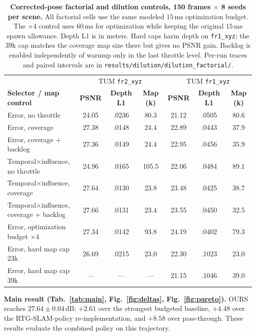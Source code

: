 \documentclass[10pt,twocolumn,letterpaper]{article}
\begin{document}
\begin{table}[t]
\centering
\footnotesize\setlength{\tabcolsep}{4pt}
\begin{tabular}{lcccccc}
\toprule
& \multicolumn{3}{c}{TUM \texttt{fr2\_xyz}} & \multicolumn{3}{c}{TUM \texttt{fr1\_xyz}} \\
\textbf{Selector / map control} & \textbf{PSNR} & \textbf{Depth L1} & \textbf{Map (k)} & \textbf{PSNR} & \textbf{Depth L1} & \textbf{Map (k)} \\
\midrule
Error, no throttle & 24.05 & .0236 & 80.3 & 21.12 & .0505 & 80.6 \\
Error, coverage & 27.38 & .0148 & 24.4 & 22.89 & .0443 & 37.9 \\
Error, coverage + backlog & 27.36 & .0149 & 24.4 & 22.95 & .0456 & 35.9 \\
Temporal$\times$influence, no throttle & 24.96 & .0165 & 105.5 & 22.06 & .0484 & 89.1 \\
Temporal$\times$influence, coverage & 27.64 & .0130 & 23.8 & 23.48 & .0425 & 38.7 \\
Temporal$\times$influence, coverage + backlog & 27.66 & .0131 & 23.4 & 23.55 & .0450 & 32.5 \\
\midrule
Error, optimization budget $\times4$ & 27.34 & .0142 & 93.8 & 24.19 & .0402 & 79.3 \\
Error, hard map cap 23k & 26.69 & .0215 & 23.0 & 22.30 & .1023 & 23.0 \\
Error, hard map cap 39k & --- & --- & --- & 21.15 & .1046 & 39.0 \\
\bottomrule
\end{tabular}
\caption{\textbf{Corrected-pose factorial and dilution controls, 150 frames $\times$ 8 seeds per scene.} All factorial cells use the same modeled $15\,\mathrm{ms}$ optimization budget. The $\times4$ control uses $60\,\mathrm{ms}$ for optimization while keeping the original $15\,\mathrm{ms}$ spawn allowance. Depth L1 is in meters. Hard caps harm depth on \texttt{fr1\_xyz}; the 39k cap matches the coverage map size there but gives no PSNR gain. Backlog is enabled independently of warmup only in the last throttle level. Per-run traces and paired intervals are in \texttt{results/dilution/dilution\_factorial/}.}
\label{tab:factorial}
\end{table}

\textbf{Main result (Tab.~\ref{tab:main}, Fig.~\ref{fig:deltas}, Fig.~\ref{fig:pareto}).}
OURS reaches $27.64 \pm 0.04\,\mathrm{dB}$: $+2.61$ over the strongest budgeted baseline, $+4.48$ over the RTG-SLAM-policy re-implementation, and $+8.58$ over pass-through. These results evaluate the combined policy on this trajectory.
\end{document}
